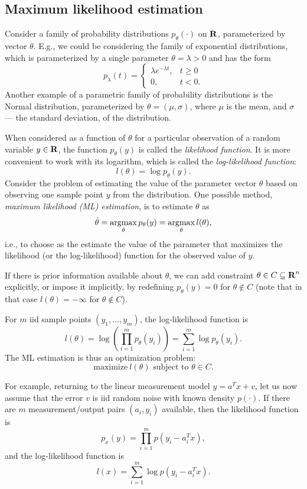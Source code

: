\documentclass[11pt]{article}
\begin{document}
\subsection{Maximum likelihood estimation}

Consider a family of probability distributions $p_\theta(\cdot)$ on ${\mbox{\textbf{R}}}$, parameterized by vector $\theta$. E.g., we could be considering the family of exponential distributions, which is parameterized by a single parameter $\theta=\lambda>0$ and has the form
$$
p_\lambda(t)=\begin{cases}\lambda e^{-\lambda t},&t\ge0\\
0,&t<0.
\end{cases}
$$ 
Another example of a parametric family of probability distributions is the Normal distribution, parameterized by $\theta=(\mu,\sigma)$, where $\mu$ is the mean, and $\sigma$ --- the standard deviation, of the distribution.

When considered as a function of $\theta$ for a particular observation of a random variable $y\in{\mbox{\textbf{R}}}$, the function $p_\theta(y)$ is called the \emph{likelihood function}. It is more convenient to work with its logarithm, which is called the \emph{log-likelihood function}:
$$
l(\theta)=\log p_\theta(y).
$$ 
Consider the problem of estimating the value of the parameter vector $\theta$ based on observing one sample point $y$ from the distribution. One possible method, \emph{maximum likelihood (ML) estimation}, is to estimate $\theta$ as 
$$
\hat \theta=\mathop{\rm argmax}_\theta p_\theta(y)=\mathop{\rm argmax}_\theta l(\theta),
$$
i.e., to choose as the estimate the value of the parameter that maximizes the likelihood (or the log-likelihood) function for the observed value of $y$.

If there is prior information available about $\theta$, we can add constraint $\theta\in C\subseteq{\mbox{\textbf{R}}}^n$ explicitly, or impose it implicitly, by redefining $p_\theta(y)=0$ for $\theta\not\in C$ (note that in that case $l(\theta)=-\infty$ for $\theta\not\in C$). 

For $m$ iid sample points $(y_1,\ldots,y_m)$, the log-likelihood function is
$$
l(\theta)=\log\left(\prod_{i=1}^m p_\theta(y_i)\right)=\sum_{i=1}^m\log p_\theta(y_i).
$$ 
The ML estimation is thus an optimization problem:
$$
\text{maximize}\ l(\theta)\text{ subject to }\theta\in C.
$$

For example, returning to the linear measurement model $y=a^Tx+v$, let us now assume that the error $v$ is iid random noise with known density $p(\cdot)$. If there are $m$ measurement/output pairs $(a_i,y_i)$ available, then the likelihood function is
$$
p_x(y)=\prod_{i=1}^mp(y_i-a_i^Tx),
$$
and the log-likelihood function is
$$
l(x)=\sum_{i=1}^m\log p(y_i-a_i^Tx).
$$
\end{document}
